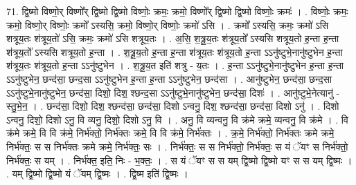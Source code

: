 \documentclass[17pt]{extarticle}
\begin{document}
71. द्वि॒ष्मो विष्णो॒र् विष्णो᳚र् द्वि॒ष्मो द्वि॒ष्मो विष्णोः॒ क्रमः॒ क्रमो॒ विष्णो᳚र् द्वि॒ष्मो द्वि॒ष्मो विष्णोः॒ क्रमः॑ । . विष्णोः॒ क्रमः॒ क्रमो॒ विष्णो॒र् विष्णोः॒ क्रमो᳚ ऽस्यसि॒ क्रमो॒ विष्णो॒र् विष्णोः॒ क्रमो॑ ऽसि । . क्रमो᳚ ऽस्यसि॒ क्रमः॒ क्रमो॑ ऽसि शत्रूय॒तः श॑त्रूय॒तो॑ ऽसि॒ क्रमः॒ क्रमो॑ ऽसि शत्रूय॒तः । . अ॒सि॒ श॒त्रू॒य॒तः श॑त्रूय॒तो᳚ ऽस्यसि शत्रूय॒तो ह॒न्ता ह॒न्ता श॑त्रूय॒तो᳚ ऽस्यसि शत्रूय॒तो ह॒न्ता । . श॒त्रू॒य॒तो ह॒न्ता ह॒न्ता श॑त्रूय॒तः श॑त्रूय॒तो ह॒न्ता ऽऽनु॑ष्टुभे॒नानु॑ष्टुभेन ह॒न्ता श॑त्रूय॒तः श॑त्रूय॒तो ह॒न्ता ऽऽनु॑ष्टुभेन । . श॒त्रू॒य॒त इति॑ शत्रु - य॒तः । . ह॒न्ता ऽऽनु॑ष्टुभे॒नानु॑ष्टुभेन ह॒न्ता ह॒न्ता ऽऽनु॑ष्टुभेन॒ छन्द॑सा॒ छन्द॒सा ऽऽनु॑ष्टुभेन ह॒न्ता ह॒न्ता ऽऽनु॑ष्टुभेन॒ छन्द॑सा । . आनु॑ष्टुभेन॒ छन्द॑सा॒ छन्द॒सा ऽऽनु॑ष्टुभे॒नानु॑ष्टुभेन॒ छन्द॑सा॒ दिशो॒ दिश॒ श्छन्द॒सा ऽऽनु॑ष्टुभे॒नानु॑ष्टुभेन॒ छन्द॑सा॒ दिशः॑ । . आनु॑ष्टुभे॒नेत्यानु॑ - स्तु॒भे॒न॒ । . छन्द॑सा॒ दिशो॒ दिश॒ श्छन्द॑सा॒ छन्द॑सा॒ दिशो ऽन्वनु॒ दिश॒ श्छन्द॑सा॒ छन्द॑सा॒ दिशो ऽनु॑ । . दिशो ऽन्वनु॒ दिशो॒ दिशो ऽनु॒ वि व्यनु॒ दिशो॒ दिशो ऽनु॒ वि । . अनु॒ वि व्यन्वनु॒ वि क्र॑मे क्रमे॒ व्यन्वनु॒ वि क्र॑मे । . वि क्र॑मे क्रमे॒ वि वि क्र॑मे॒ निर्भ॑क्तो॒ निर्भ॑क्तः क्रमे॒ वि वि क्र॑मे॒ निर्भ॑क्तः । . क्र॒मे॒ निर्भ॑क्तो॒ निर्भ॑क्तः क्रमे क्रमे॒ निर्भ॑क्तः॒ स स निर्भ॑क्तः क्रमे क्रमे॒ निर्भ॑क्तः॒ सः । . निर्भ॑क्तः॒ स स निर्भ॑क्तो॒ निर्भ॑क्तः॒ स यं ॅयꣳ स निर्भ॑क्तो॒ निर्भ॑क्तः॒ स यम् । . निर्भ॑क्त॒ इति॒ निः - भ॒क्तः॒ । . स यं ॅयꣳ स स यम् द्वि॒ष्मो द्वि॒ष्मो यꣳ स स यम् द्वि॒ष्मः । . यम् द्वि॒ष्मो द्वि॒ष्मो यं ॅयम् द्वि॒ष्मः । . द्वि॒ष्म इति॑ द्वि॒ष्मः । \newline
\pagebreak
{}
\end{document}
